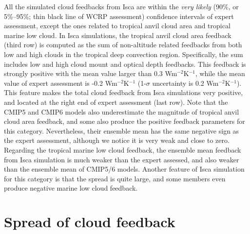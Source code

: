 All the simulated cloud feedbacks from Isca are within the \textit{very likely} (90\%, or 5\%--95\%; thin black line of WCRP assessment) confidence intervals of expert assessment, except the ones related to tropical anvil cloud area and tropical marine low cloud. In Isca simulations, the tropical anvil cloud area feedback (third row) is computed as the sum of non-altitude related feedbacks from both low and high clouds in the tropical deep convection region. Specifically, the sum includes low and high cloud mount and optical depth feedbacks. This feedback is strongly positive with the mean value larger than 0.3 Wm$^{-2}$K$^{-1}$, while the mean value of expert assessment is -0.2 Wm$^{-2}$K$^{-1}$ (1-$\sigma$ uncertainty is 0.2 Wm$^{-2}$K$^{-1}$). This feature makes the total cloud feedback from Isca simulations very positive, and located at the right end of expert assessment (last row). Note that the CMIP5 and CMIP6 models also underestimate the magnitude of tropical anvil cloud area feedback, and some also produce the positive feedback parameters for this category. Nevertheless, their ensemble mean has the same negative sign as the expert assessment, although we notice it is very weak and close to zero. Regarding the tropical marine low cloud feedback, the ensemble mean feedback from Isca simulation is much weaker than the expert assessed, and also weaker than the ensemble mean of CMIP5/6 models. Another feature of Isca simulation for this category is that the spread is quite large, and some members even produce negative marine low cloud feedback.



\section{Spread of cloud feedback}
\label{sec:spread_of_cld_fbk_in_PPE}

